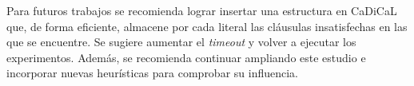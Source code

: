 \begin{recomendations}
Para futuros trabajos se recomienda lograr insertar una estructura en CaDiCaL que, de forma eficiente, almacene por cada literal las cl\'ausulas insatisfechas en las que se encuentre. Se sugiere aumentar el \textit{timeout} y volver a ejecutar los experimentos. Adem\'as, se recomienda continuar ampliando este estudio e incorporar nuevas heurísticas para comprobar su influencia.
\end{recomendations}
